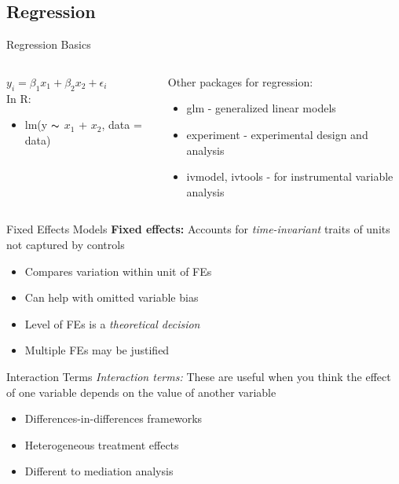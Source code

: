 \documentclass{beamer}
\begin{document}
\subsection{Regression} 
\begin{frame}[fragile]{Regression Basics}
\begin{columns}
\begin{column}{0.5\textwidth}
$y_{i} = \beta_1 x_1 + \beta_2 x_2 + \epsilon_{i}$ \\ \vspace{.5cm} 
In R: \begin{itemize}
    \item lm(y $\thicksim$ $x_1$ + $x_2$, data = data) 
\end{itemize}
 \end{column}
 \begin{column}{0.5\textwidth}
Other packages for regression: 
\begin{itemize}
    \item glm - generalized linear models 
    \item experiment - experimental design and analysis 
    \item ivmodel, ivtools - for instrumental variable analysis 
\end{itemize}
\end{column}
\end{columns} 
\end{frame} 
\begin{frame}{Fixed Effects Models}
\textbf{Fixed effects:} Accounts for \textit{time-invariant} traits of units not captured by controls 
\begin{itemize}
    \item Compares variation within unit of FEs 
    \item Can help with omitted variable bias
    \item Level of FEs is a \textit{theoretical decision} 
    \item Multiple FEs may be justified
\end{itemize}
\end{frame} 
\begin{frame}{Interaction Terms}
\textit{Interaction terms:} These are useful when you think the effect of one variable depends on the value of another variable 
\begin{itemize}
    \item Differences-in-differences frameworks 
    \item Heterogeneous treatment effects 
    \item Different to mediation analysis 
\end{itemize}
\end{frame} 
\end{document}
